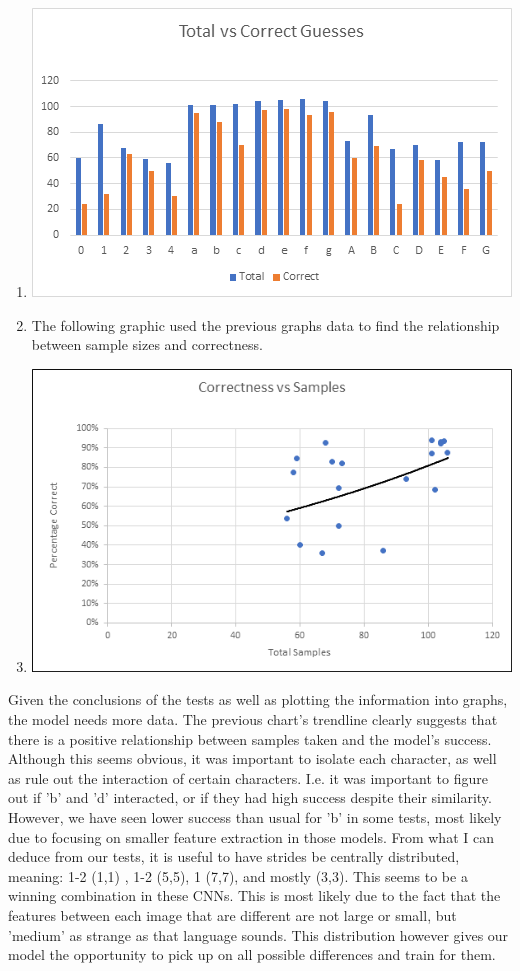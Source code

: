 \documentclass[12pt]{article} %
\begin{document}
\begin{enumerate}[label = (\roman*)]
\item\includegraphics{charts/total-vs-correct}
\item The following graphic used the previous graphs data to find the relationship between sample sizes and correctness.
\item\includegraphics {charts/correct-vs-samples}
\end{enumerate}
Given the conclusions of the tests as well as plotting the information into graphs, the model needs more data. The previous chart's trendline clearly suggests that there is a positive relationship between samples taken and the model's success. Although this seems obvious, it was important to isolate each character, as well as rule out the interaction of certain characters. I.e. it was important to figure out if 'b' and 'd' interacted, or if they had high success despite their similarity. However, we have seen lower success than usual for 'b' in some tests, most likely due to focusing on smaller feature extraction in those models. From what I can deduce from our tests, it is useful to have strides be centrally distributed, meaning: 1-2 (1,1) , 1-2 (5,5), 1 (7,7), and mostly (3,3). This seems to be a winning combination in these CNNs. This is most likely due to the fact that the features between each image that are different are not large or small, but 'medium' as strange as that language sounds. This distribution however gives our model the opportunity to pick up on all possible differences and train for them.
\end{document}
